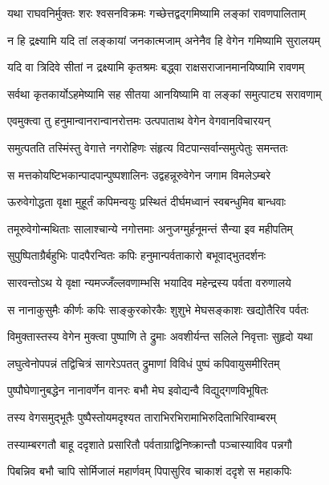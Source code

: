 \twolineshloka
{यथा राघवनिर्मुक्तः शरः श्वसनविक्रमः}
{गच्छेत्तद्वद्गमिष्यामि लङ्कां रावणपालिताम्} %

\twolineshloka
{न हि द्रक्ष्यामि यदि तां लङ्कायां जनकात्मजाम्}
{अनेनैव हि वेगेन गमिष्यामि सुरालयम्} %

\twolineshloka
{यदि वा त्रिदिवे सीतां न द्रक्ष्यामि कृतश्रमः}
{बद्ध्वा राक्षसराजानमानयिष्यामि रावणम्} %

\twolineshloka
{सर्वथा कृतकार्योऽहमेष्यामि सह सीतया}
{आनयिष्यामि वा लङ्कां समुत्पाट्य सरावणाम्} %

\twolineshloka
{एवमुक्त्वा तु हनुमान्वानरान्वानरोत्तमः}
{उत्पपाताथ वेगेन वेगवानविचारयन्} %

\twolineshloka
{समुत्पतति तस्मिंस्तु वेगात्ते नगरोहिणः}
{संहृत्य विटपान्सर्वान्समुत्पेतुः समन्ततः} %

\twolineshloka
{स मत्तकोयष्टिभकान्पादपान्पुष्पशालिनः}
{उद्वहन्नूरुवेगेन जगाम विमलेऽम्बरे} %

\twolineshloka
{ऊरुवेगोद्धता वृक्षा मुहूर्तं कपिमन्वयुः}
{प्रस्थितं दीर्घमध्वानं स्वबन्धुमिव बान्धवाः} %

\twolineshloka
{तमूरुवेगोन्मथिताः सालाश्चान्ये नगोत्तमाः}
{अनुजग्मुर्हनूमन्तं सैन्या इव महीपतिम्} %

\twolineshloka
{सुपुष्पिताग्रैर्बहुभिः पादपैरन्वितः कपिः}
{हनुमान्पर्वताकारो बभूवाद्भुतदर्शनः} %

\twolineshloka
{सारवन्तोऽथ ये वृक्षा न्यमज्जँल्लवणाम्भसि}
{भयादिव महेन्द्रस्य पर्वता वरुणालये} %

\twolineshloka
{स नानाकुसुमैः कीर्णः कपिः साङ्कुरकोरकैः}
{शुशुभे मेघसङ्काशः खद्योतैरिव पर्वतः} %

\twolineshloka
{विमुक्तास्तस्य वेगेन मुक्त्वा पुष्पाणि ते द्रुमाः}
{अवशीर्यन्त सलिले निवृत्ताः सुहृदो यथा} %

\twolineshloka
{लघुत्वेनोपपन्नं तद्विचित्रं सागरेऽपतत्}
{द्रुमाणां विविधं पुष्पं कपिवायुसमीरितम्} %

\twolineshloka
{पुष्पौघेणानुबद्धेन नानावर्णेन वानरः}
{बभौ मेघ इवोद्यन्वै विद्युद्गणविभूषितः} %

\twolineshloka
{तस्य वेगसमुद्भूतैः पुष्पैस्तोयमदृश्यत}
{ताराभिरभिरामाभिरुदिताभिरिवाम्बरम्} %

\twolineshloka
{तस्याम्बरगतौ बाहू ददृशाते प्रसारितौ}
{पर्वताग्राद्विनिष्क्रान्तौ पञ्चास्याविव पन्नगौ} %

\twolineshloka
{पिबन्निव बभौ चापि सोर्मिजालं महार्णवम्}
{पिपासुरिव चाकाशं ददृशे स महाकपिः} %

